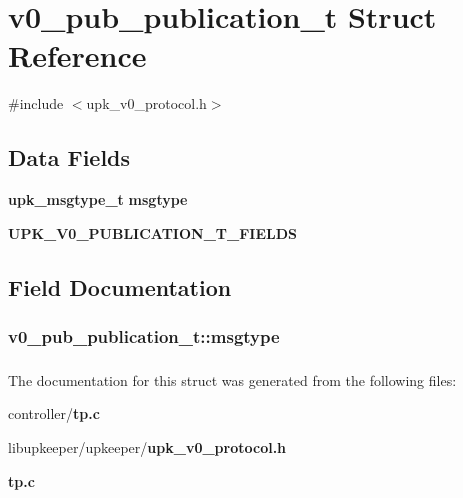 \section{v0\_\-pub\_\-publication\_\-t Struct Reference}
\label{structv0__pub__publication__t}


{\ttfamily \#include $<$upk\_\-v0\_\-protocol.h$>$}

\subsection*{Data Fields}
\begin{DoxyCompactItemize}
\item 
{\bf upk\_\-msgtype\_\-t} {\bf msgtype}
\item 
{\bf UPK\_\-V0\_\-PUBLICATION\_\-T\_\-FIELDS}
\end{DoxyCompactItemize}


\subsection{Field Documentation}
\subsubsection[{msgtype}]{ {\bf v0\_\-pub\_\-publication\_\-t::msgtype}}\label{structv0__pub__publication__t_a7c701a076917b4a7f74be4f2bf691f77}
\subsubsection[{UPK\_\-V0\_\-PUBLICATION\_\-T\_\-FIELDS}]{}\label{structv0__pub__publication__t_a6c51a079cf827fb5afb5ebddf0e05f39}


The documentation for this struct was generated from the following files:\begin{DoxyCompactItemize}
\item 
controller/{\bf tp.c}\item 
libupkeeper/upkeeper/{\bf upk\_\-v0\_\-protocol.h}\item 
{\bf tp.c}\end{DoxyCompactItemize}
